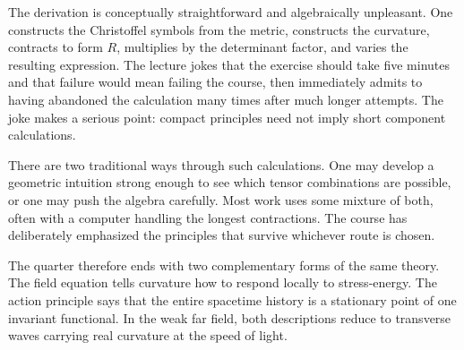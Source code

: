 The derivation is conceptually straightforward and algebraically unpleasant.
One constructs the Christoffel symbols from the metric, constructs the
curvature, contracts to form \(R\), multiplies by the determinant factor,
and varies the resulting expression. The lecture jokes that the exercise
should take five minutes and that failure would mean failing the course,
then immediately admits to having abandoned the calculation many times
after much longer attempts. The joke makes a serious point: compact
principles need not imply short component calculations.

\begin{classroomqa}
\end{classroomqa}

There are two traditional ways through such calculations. One may develop a
geometric intuition strong enough to see which tensor combinations are
possible, or one may push the algebra carefully. Most work uses some mixture
of both, often with a computer handling the longest contractions. The
course has deliberately emphasized the principles that survive whichever
route is chosen.

\begin{classroomqa}
\end{classroomqa}

The quarter therefore ends with two complementary forms of the same theory.
The field equation tells curvature how to respond locally to stress-energy.
The action principle says that the entire spacetime history is a stationary
point of one invariant functional. In the weak far field, both descriptions
reduce to transverse waves carrying real curvature at the speed of light.

